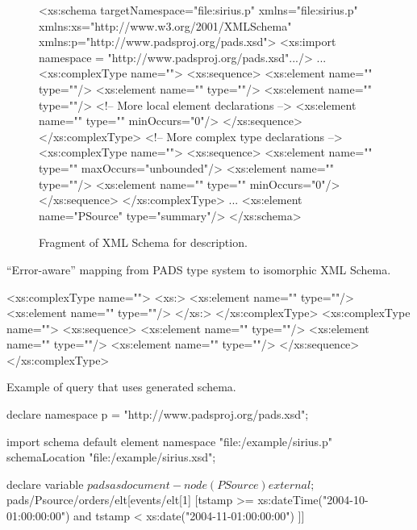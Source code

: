 \begin{figure*}
\begin{small}
\begin{code}
<xs:schema targetNamespace="file:sirius.p"
           xmlns="file:sirius.p"
           xmlns:xs="http://www.w3.org/2001/XMLSchema"
           xmlns:p="http://www.padsproj.org/pads.xsd">
<xs:import namespace = "http://www.padsproj.org/pads.xsd".../>
...
<xs:complexType name="">
 <xs:sequence>
  <xs:element name=""     type=""/>
  <xs:element name="" type=""/>
  <xs:element name=""   type=""/>
  <!-- More local element declarations -->
  <xs:element name=""            type="" minOccurs="0"/>
 </xs:sequence>
</xs:complexType>
<!-- More complex type declarations -->
<xs:complexType name="">
 <xs:sequence>
  <xs:element name=""    type="" maxOccurs="unbounded"/>
  <xs:element name="" type=""/>
  <xs:element name=""     type="" minOccurs="0"/>
 </xs:sequence>
</xs:complexType>
...
<xs:element name="PSource" type="summary"/>
</xs:schema>
\end{code}
\end{small}
\caption{Fragment of XML Schema for \dibbler{} \pads{} description.}
\label{figure:dibbler-schema}
\end{figure*}

``Error-aware'' mapping from PADS type system to isomorphic XML
Schema. 
\begin{small}
\begin{code}
<xs:complexType name="">
  <xs:>
   <xs:element name="" type=""/>
   <xs:element name=""  type=""/>
  </xs:>
</xs:complexType>
<xs:complexType name="">
 <xs:sequence>
   <xs:element name=""  type=""/>
   <xs:element name="" type=""/>
   <xs:element name=""     type=""/>
 </xs:sequence>
</xs:complexType>
\end{code}
\end{small}

Example of query that uses generated schema.
\begin{small}
\begin{code}
declare namespace p = "http://www.padsproj.org/pads.xsd";

import schema default element namespace "file:/example/sirius.p"
  schemaLocation "file:/example/sirius.xsd";

declare variable $pads as document-node(PSource) external; 

$pads/Psource/orders/elt[events/elt[1]
  [tstamp >= xs:dateTime("2004-10-01:00:00:00") and 
   tstamp < xs:date("2004-11-01:00:00:00") ]]
\end{code}
\end{small}

